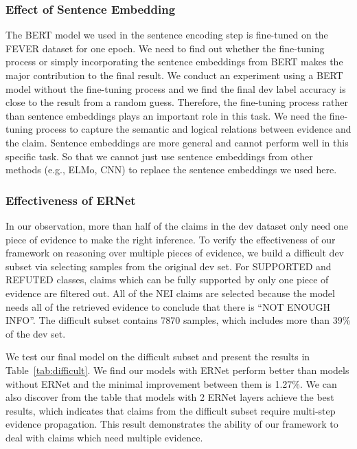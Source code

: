 \documentclass[11pt,a4paper]{article}
\begin{document}
\subsubsection*{Effect of Sentence Embedding}
The BERT model we used in the sentence encoding step is fine-tuned on the FEVER dataset for one epoch. We need to find out whether the fine-tuning process or simply incorporating the sentence embeddings from BERT makes the major contribution to the final result. We conduct an experiment using a BERT model without the fine-tuning process and we find the final dev label accuracy is close to the result from a random guess. Therefore, the fine-tuning process rather than sentence embeddings plays an important role in this task. We need the fine-tuning process to capture the semantic and logical relations between evidence and the claim. Sentence embeddings are more general and cannot perform well in this specific task. So that we cannot just use sentence embeddings from other methods (e.g., ELMo, CNN) to replace the sentence embeddings we used here.

\subsubsection*{Effectiveness of ERNet}
In our observation, more than half of the claims in the dev dataset only need one piece of evidence to make the right inference. To verify the effectiveness of our framework on reasoning over multiple pieces of evidence, we build a difficult dev subset via selecting samples from the original dev set. For SUPPORTED and REFUTED classes, claims which can be fully supported by only one piece of evidence are filtered out. All of the NEI claims are selected because the model needs all of the retrieved evidence to conclude that there is ``NOT ENOUGH INFO''. The difficult subset contains 7870 samples, which includes more than 39\% of the dev set. 

We test our final model on the difficult subset and present the results in Table~\ref{tab:difficult}. We find our models with ERNet perform better than models without ERNet and the minimal improvement between them is 1.27\%. We can also discover from the table that models with 2 ERNet layers achieve the best results, which indicates that claims from the difficult subset require multi-step evidence propagation.
This result demonstrates the ability of our framework to deal with claims which need multiple evidence. 
\end{document}
